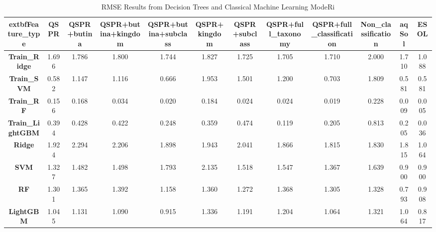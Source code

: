 ﻿\begin{table}[!ht]
    \centering
    \caption{RMSE Results from Decision Trees and Classical Machine Learning ModeRi}
    \begin{tabular}{|c|c|c|c|c|c|c|c|c|c|c|c|}
    \hline
        	extbf{Feature\_type} & \textbf{QSPR} & \textbf{QSPR+butina} & \textbf{QSPR+butina+kingdom} & \textbf{QSPR+butina+subclass} & \textbf{QSPR+kingdom} & \textbf{QSPR+subclass} & \textbf{QSPR+full\_taxonomy} & \textbf{QSPR+full\_classification} & \textbf{Non\_classification} & \textbf{aqSol} & \textbf{ESOL} \\ \hline
        \textbf{Train\_Ridge} & 1.696 & 1.786 & 1.800 & 1.744 & 1.827 & 1.725 & 1.705 & 1.710 & 2.000 & 1.710 & 1.088 \\ \hline
        \textbf{Train\_SVM} & 0.582 & 1.147 & 1.116 & 0.666 & 1.953 & 1.501 & 1.200 & 0.703 & 1.809 & 0.581 & 0.581 \\ \hline
        \textbf{Train\_RF} & 0.156 & 0.168 & 0.034 & 0.020 & 0.184 & 0.024 & 0.024 & 0.019 & 0.228 & 0.009 & 0.005 \\ \hline
        \textbf{Train\_LightGBM} & 0.394 & 0.428 & 0.422 & 0.248 & 0.359 & 0.474 & 0.119 & 0.205 & 0.813 & 0.205 & 0.036 \\ \hline
        \textbf{Ridge} & 1.924 & 2.294 & 2.206 & 1.898 & 1.943 & 2.041 & 1.866 & 1.815 & 1.830 & 1.815 & 1.064 \\ \hline
        \textbf{SVM} & 1.327 & 1.482 & 1.498 & 1.793 & 2.135 & 1.518 & 1.547 & 1.367 & 1.639 & 0.900 & 0.900 \\ \hline
        \textbf{RF} & 1.301 & 1.365 & 1.392 & 1.158 & 1.360 & 1.272 & 1.368 & 1.305 & 1.328 & 0.793 & 0.908 \\ \hline
        \textbf{LightGBM} & 1.045 & 1.131 & 1.090 & 0.915 & 1.336 & 1.191 & 1.204 & 1.064 & 1.321 & 1.064 & 0.817 \\ \hline
    \end{tabular}
\end{table}